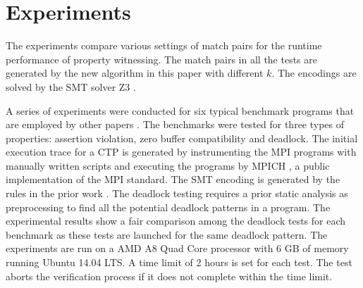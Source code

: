 \section{Experiments}
The experiments compare various settings of match pairs for the runtime performance of property witnessing.
The match pairs in all the tests are generated by the new algorithm in this paper with different $k$. 
The encodings are solved by the SMT solver Z3 \cite{demoura:tacas08}. 

A series of experiments were conducted for six typical benchmark programs that are employed by other papers \cite{benchmark:fevs,mpptest_benchmark,DBLP:conf/kbse/HuangMM13,HuangDeadlock,DBLP:conf/ppopp/XueLWGCZZV09}. The benchmarks were tested for three types of properties: assertion violation, zero buffer compatibility and deadlock. 
The initial execution trace for a CTP is generated by instrumenting the MPI programs with manually written scripts and executing the programs by MPICH \cite{mpich}, a public implementation of the MPI standard. The SMT encoding is generated by the rules in the prior work \cite{DBLP:conf/kbse/HuangMM13,HuangNFM15,HuangDeadlock}. The deadlock testing requires a prior static analysis as preprocessing to find all the potential deadlock patterns in a program. 
The experimental results show a fair comparison among the deadlock tests for each benchmark as these tests are launched for the same deadlock pattern. 
The experiments are run on a AMD A8 Quad Core processor with 6 GB of memory running Ubuntu 14.04 LTS. A time limit of 2 hours is set for each test. The test aborts the verification process if it does not complete within the time limit.

